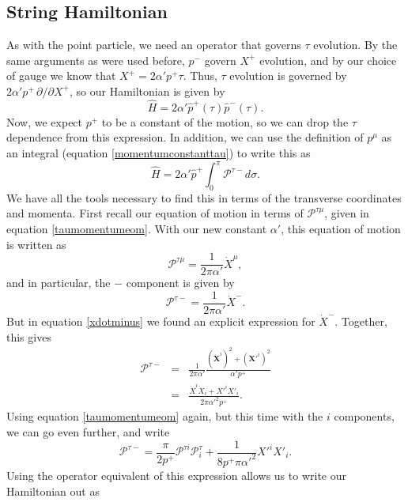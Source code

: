 \documentclass[a4paper,12pt]{article}
\numberwithin{equation}{section}
\begin{document}
\subsection{String Hamiltonian}
As with the point particle, we need an operator that governs $\tau$ evolution. By the same arguments as were used before, $p^-$ govern $X^+$ evolution, and by our choice of gauge we know that $X^+ = 2\alpha'p^+\tau$. Thus, $\tau$ evolution is governed by $2\alpha'p^+\,\partial/\partial X^+$, so our Hamiltonian is given by 
\begin{equation}\label{stringphamiltonian}
\hat{H} = 2\alpha'\hat{ p}^+(\tau) \hat{p}^-(\tau).
\end{equation}
Now, we expect $p^+$ to be a constant of the motion, so we can drop the $\tau$ dependence from this expression. In addition, we can use the definition of $p^\mu$ as an integral (equation \ref{momentumconstanttau}) to write this as
\begin{equation}
\hat{H} = 2\alpha'\hat{p}^+\int_0^\pi \mathcal{P}^{\tau -}d\sigma.
\end{equation} 
We have all the tools necessary to find this in terms of the transverse coordinates and momenta. First recall our equation of motion in terms of $\mathcal{P}^{\tau \mu}$, given in equation \ref{taumomentumeom}. With our new constant $\alpha'$, this equation of motion is written as
\begin{equation}\label{taumomentumeom2}
\mathcal{P}^{\tau \mu} = \frac{1}{2\pi\alpha'}\dot{X}^\mu,
\end{equation} 
and in particular, the $-$ component is given by
\begin{equation}
\mathcal{P}^{\tau -} = \frac{1}{2\pi\alpha'}\dot{X}^-.
\end{equation} 
But in equation \ref{xdotminus} we found an explicit expression for $\dot{X}^-$. Together, this gives
\begin{eqnarray*}
\mathcal{P}^{\tau -} &=& \frac{1}{2\pi\alpha'}\frac{(\dot{\mathbf{X}}^i)^2 + (\mathbf{X}'^i)^2}{\alpha'p^+}\\
&=&\frac{\dot{X}^i\dot{X}_i + X'^iX'_i}{2\pi\alpha'^2p^+}.
\end{eqnarray*}
Using equation \ref{taumomentumeom} again, but this time with the $i$ components, we can go even further, and write
\begin{equation}
\mathcal{P}^{\tau -} = \frac{\pi}{2p^+}\mathcal{P}^{\tau i}\mathcal{P}^\tau_i + \frac{1}{8p^+\pi\alpha'^2}X'^iX'_i.
\end{equation}
Using the operator equivalent of this expression allows us to write our Hamiltonian out as
\end{document}
